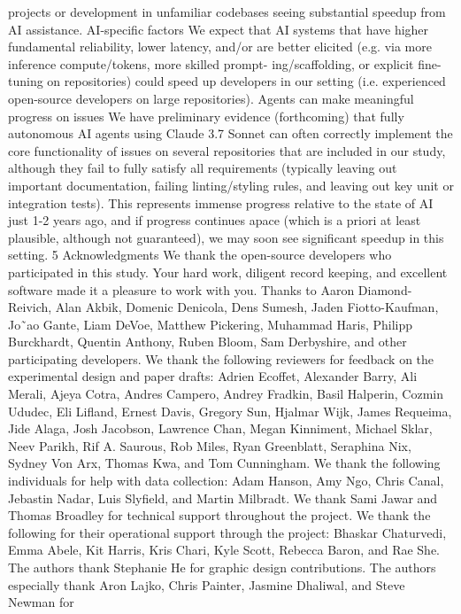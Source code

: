 projects or development in unfamiliar codebases seeing substantial speedup from AI assistance.
AI-specific factors
We expect that AI systems that have higher fundamental reliability, lower
latency, and/or are better elicited (e.g. via more inference compute/tokens, more skilled prompt-
ing/scaffolding, or explicit fine-tuning on repositories) could speed up developers in our setting (i.e.
experienced open-source developers on large repositories).
Agents can make meaningful progress on issues
We have preliminary evidence (forthcoming)
that fully autonomous AI agents using Claude 3.7 Sonnet can often correctly implement the core
functionality of issues on several repositories that are included in our study, although they fail to
fully satisfy all requirements (typically leaving out important documentation, failing linting/styling
rules, and leaving out key unit or integration tests). This represents immense progress relative to the
state of AI just 1-2 years ago, and if progress continues apace (which is a priori at least plausible,
although not guaranteed), we may soon see significant speedup in this setting.
5
Acknowledgments
We thank the open-source developers who participated in this study. Your hard work, diligent
record keeping, and excellent software made it a pleasure to work with you. Thanks to Aaron
Diamond-Reivich, Alan Akbik, Domenic Denicola, Dens Sumesh, Jaden Fiotto-Kaufman, Jo˜ao
Gante, Liam DeVoe, Matthew Pickering, Muhammad Haris, Philipp Burckhardt, Quentin Anthony,
Ruben Bloom, Sam Derbyshire, and other participating developers.
We thank the following reviewers for feedback on the experimental design and paper drafts:
Adrien Ecoffet, Alexander Barry, Ali Merali, Ajeya Cotra, Andres Campero, Andrey Fradkin, Basil
Halperin, Cozmin Ududec, Eli Lifland, Ernest Davis, Gregory Sun, Hjalmar Wijk, James Requeima,
Jide Alaga, Josh Jacobson, Lawrence Chan, Megan Kinniment, Michael Sklar, Neev Parikh, Rif A.
Saurous, Rob Miles, Ryan Greenblatt, Seraphina Nix, Sydney Von Arx, Thomas Kwa, and Tom
Cunningham.
We thank the following individuals for help with data collection: Adam Hanson, Amy Ngo, Chris
Canal, Jebastin Nadar, Luis Slyfield, and Martin Milbradt.
We thank Sami Jawar and Thomas Broadley for technical support throughout the project.
We thank the following for their operational support through the project: Bhaskar Chaturvedi, Emma
Abele, Kit Harris, Kris Chari, Kyle Scott, Rebecca Baron, and Rae She.
The authors thank Stephanie He for graphic design contributions.
The authors especially thank Aron Lajko, Chris Painter, Jasmine Dhaliwal, and Steve Newman for
